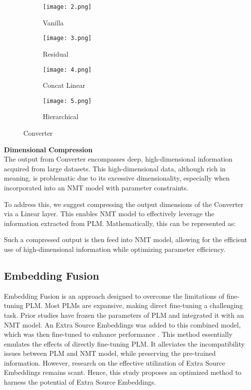 \documentclass[conference]{IEEEtran}
\begin{document}
\begin{figure}[!tb]
    \centering
    \begin{subfigure}{.25\textwidth}
        \centering
        \texttt{[image: 2.png]}
        \caption{Vanilla}
        \label{fig:a}
    \end{subfigure}\begin{subfigure}{.25\textwidth}
        \centering
        \texttt{[image: 3.png]}
        \caption{Residual}
    \end{subfigure}
    
    \vspace{1em} 

    \begin{subfigure}{.25\textwidth}
        \centering
        \texttt{[image: 4.png]}
        \caption{Concat Linear}
    \end{subfigure}\begin{subfigure}{.25\textwidth}
        \centering
        \texttt{[image: 5.png]}
        \caption{Hierarchical}
    \end{subfigure}
    \caption{Converter}
\end{figure}


\noindent \textbf{Dimensional Compression}\\
The output from Converter encompasses deep, high-dimensional information acquired from large datasets. This high-dimensional data, although rich in meaning, is problematic due to its excessive dimensionality, especially when incorporated into an NMT model with parameter constraints.

To address this, we suggest compressing the output dimensions of the Converter via a Linear layer. This enables NMT model to effectively leverage the information extracted from PLM. Mathematically, this can be represented as:



Such a compressed output is then feed into NMT model, allowing for the efficient use of high-dimensional information while optimizing parameter efficiency.

\subsection{Embedding Fusion}
Embedding Fusion is an approach designed to overcome the limitations of fine-tuning PLM. Most PLMs are expansive, making direct fine-tuning a challenging task. Prior studies have frozen the parameters of PLM and integrated it with an NMT model. An Extra Source Embeddings was added to this combined model, which was then fine-tuned to enhance performance \cite{Ding2018}. This method essentially emulates the effects of directly fine-tuning PLM. It alleviates the incompatibility issues between PLM and NMT model, while preserving the pre-trained information. However, research on the effective utilization of Extra Source Embeddings remains scant. Hence, this study proposes an optimized method to harness the potential of Extra Source Embeddings.
\end{document}
